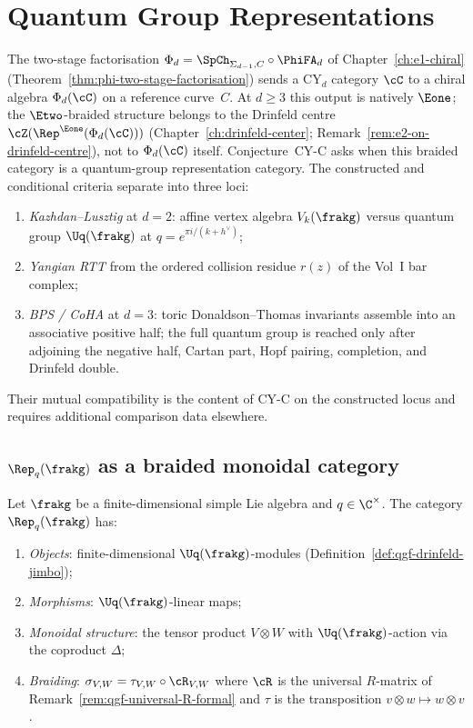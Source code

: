 \chapter{Quantum Group Representations}
\label{ch:quantum-group-reps}

The two-stage factorisation $\Phi_d = \SpCh_{\Sigma_{d-1}, C} \circ \PhiFA_d$ of Chapter~\ref{ch:e1-chiral} (Theorem~\ref{thm:phi-two-stage-factorisation}) sends a CY$_d$
category $\cC$ to a chiral algebra $\Phi_d(\cC)$ on a reference curve~$C$.
At $d \geq 3$ this output is natively $\Eone$; the $\Etwo$-braided
structure belongs to the Drinfeld centre
$\cZ(\Rep^{\Eone}(\Phi_d(\cC)))$
(Chapter~\ref{ch:drinfeld-center}; Remark~\ref{rem:e2-on-drinfeld-centre}),
not to $\Phi_d(\cC)$ itself. Conjecture~CY-C asks when this braided
category is a quantum-group representation category. The constructed
and conditional criteria separate into three loci:
\begin{enumerate}[label=(\alph*)]
 \item \emph{Kazhdan--Lusztig} at $d = 2$: affine vertex algebra
 $V_k(\frakg)$ versus quantum group $\Uq(\frakg)$ at
 $q = e^{\pi i/(k+h^\vee)}$;
 \item \emph{Yangian RTT} from the ordered collision residue
 $r(z)$ of the Vol~I bar complex;
 \item \emph{BPS / CoHA} at $d = 3$: toric Donaldson--Thomas
 invariants assemble into an associative positive half; the full
 quantum group is reached only after adjoining the negative half,
 Cartan part, Hopf pairing, completion, and Drinfeld double.
\end{enumerate}
Their mutual compatibility is the content of CY-C on the constructed
locus and requires additional comparison data elsewhere.


\section{\texorpdfstring{$\Rep_q(\frakg)$}{Rep-q(frakg)} as a braided monoidal category}
\label{sec:rep-q-braided}

\begin{definition}
\label{def:rep-q}
Let $\frakg$ be a finite-dimensional simple Lie algebra and
$q \in \C^\times$. The category $\Rep_q(\frakg)$ has:
\begin{enumerate}[label=(\roman*)]
 \item \emph{Objects}: finite-dimensional $\Uq(\frakg)$-modules
 (Definition~\ref{def:qgf-drinfeld-jimbo});
 \item \emph{Morphisms}: $\Uq(\frakg)$-linear maps;
 \item \emph{Monoidal structure}: the tensor product
 $V \otimes W$ with $\Uq(\frakg)$-action via the coproduct
 $\Delta$;
 \item \emph{Braiding}: $\sigma_{V,W} = \tau_{V,W} \circ \cR_{V,W}$
 where $\cR$ is the universal $R$-matrix of
 Remark~\ref{rem:qgf-universal-R-formal} and $\tau$ is the
 transposition $v \otimes w \mapsto w \otimes v$.
\end{enumerate}
\end{definition}

